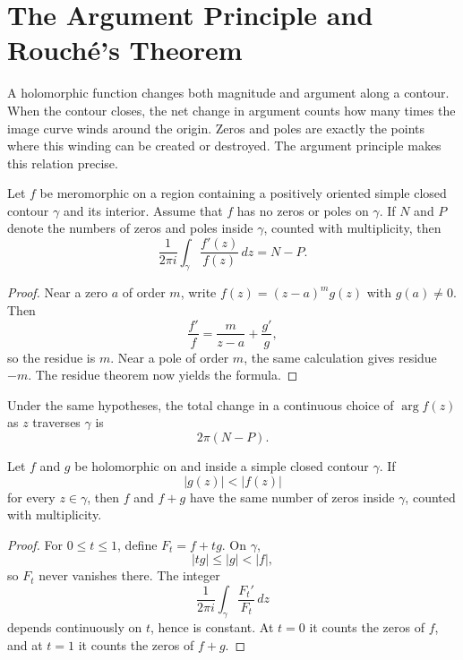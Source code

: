 \section{The Argument Principle and Rouché's Theorem}

A holomorphic function changes both magnitude and argument along a contour. When the contour closes, the net change in argument counts how many times the image curve winds around the origin. Zeros and poles are exactly the points where this winding can be created or destroyed. The argument principle makes this relation precise.

\begin{theorem}
Let $f$ be meromorphic on a region containing a positively oriented simple closed contour $\gamma$ and its interior. Assume that $f$ has no zeros or poles on $\gamma$. If $N$ and $P$ denote the numbers of zeros and poles inside $\gamma$, counted with multiplicity, then
\[
    \frac{1}{2\pi i}\int_\gamma\frac{f'(z)}{f(z)}\,dz=N-P.
\]
\end{theorem}

\begin{proof}
Near a zero $a$ of order $m$, write $f(z)=(z-a)^m g(z)$ with $g(a)\neq0$. Then
\[
    \frac{f'}{f}=\frac{m}{z-a}+\frac{g'}{g},
\]
so the residue is $m$. Near a pole of order $m$, the same calculation gives residue $-m$. The residue theorem now yields the formula.
\end{proof}

\begin{corollary}
Under the same hypotheses, the total change in a continuous choice of $\arg f(z)$ as $z$ traverses $\gamma$ is
\[
    2\pi(N-P).
\]
\end{corollary}

\begin{theorem}
Let $f$ and $g$ be holomorphic on and inside a simple closed contour $\gamma$. If
\[
    |g(z)|<|f(z)|
\]
for every $z\in\gamma$, then $f$ and $f+g$ have the same number of zeros inside $\gamma$, counted with multiplicity.
\end{theorem}

\begin{proof}
For $0\leq t\leq1$, define $F_t=f+tg$. On $\gamma$,
\[
    |tg|\leq|g|<|f|,
\]
so $F_t$ never vanishes there. The integer
\[
    \frac{1}{2\pi i}\int_\gamma\frac{F_t'}{F_t}\,dz
\]
depends continuously on $t$, hence is constant. At $t=0$ it counts the zeros of $f$, and at $t=1$ it counts the zeros of $f+g$.
\end{proof}

